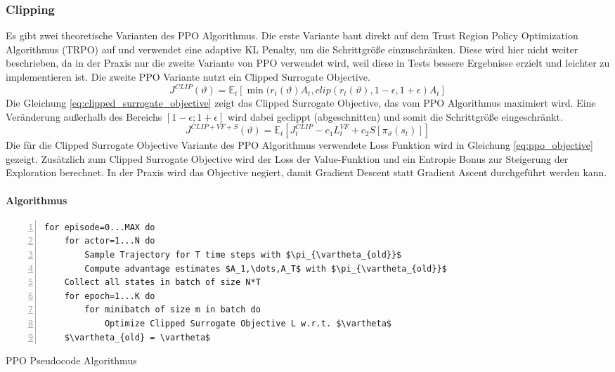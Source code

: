 \subsubsection{Clipping}
Es gibt zwei theoretische Varianten des PPO Algorithmus. Die erste Variante baut direkt auf dem Trust Region Policy Optimization Algorithmus (TRPO) \cite{trpoPaper} auf und verwendet eine adaptive KL Penalty, um die Schrittgröße einzuschränken. Diese wird hier nicht weiter beschrieben, da in der Praxis nur die zweite Variante von PPO verwendet wird, weil diese in Tests bessere Ergebnisse erzielt und leichter zu implementieren ist.
Die zweite PPO Variante nutzt ein Clipped Surrogate Objective.
\begin{equation}
    J^{CLIP}(\vartheta) = \mathbb{E}_t\left[ \min(r_t(\vartheta)A_t,clip(r_t(\vartheta),1-\epsilon,1+\epsilon)A_t \right]
    \label{eq:clipped_surrogate_objective}
\end{equation}
Die Gleichung \ref{eq:clipped_surrogate_objective} zeigt das Clipped Surrogate Objective, das vom PPO Algorithmus maximiert wird. Eine Veränderung außerhalb des Bereichs $[1-\epsilon; 1+\epsilon]$ wird dabei geclippt (abgeschnitten) und somit die Schrittgröße eingeschränkt.
\begin{equation}
    J^{CLIP+VF+S}(\vartheta) = \mathbb{E}_t \left[ J_t^{CLIP} - c_1L_t^{VF} + c_2S[\pi_\vartheta(s_t)] \right]
    \label{eq:ppo_objective}
\end{equation}
Die für die Clipped Surrogate Objective Variante des PPO Algorithmus verwendete Loss Funktion wird in Gleichung \ref{eq:ppo_objective} gezeigt. Zusätzlich zum Clipped Surrogate Objective wird der Loss der Value-Funktion und ein Entropie Bonus zur Steigerung der Exploration berechnet. In der Praxis wird das Objective negiert, damit Gradient Descent statt Gradient Ascent durchgeführt werden kann. \cite{PPOPaper}

\paragraph{Algorithmus}

\begin{algorithm}
\begin{lstlisting}[mathescape=true, numbers=left]
for episode=0...MAX do
    for actor=1...N do
        Sample Trajectory for T time steps with $\pi_{\vartheta_{old}}$
        Compute advantage estimates $A_1,\dots,A_T$ with $\pi_{\vartheta_{old}}$
    Collect all states in batch of size N*T
    for epoch=1...K do
        for minibatch of size m in batch do
            Optimize Clipped Surrogate Objective L w.r.t. $\vartheta$
    $\vartheta_{old} = \vartheta$
\end{lstlisting}
\caption{PPO Pseudocode Algorithmus \cite{FoundationsDeepRL}}
\label{alg:ppo}
\end{algorithm}

